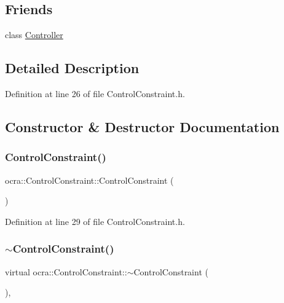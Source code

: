 \subsection*{Friends}
\begin{DoxyCompactItemize}
\item 
class \hyperlink{classocra_1_1ControlConstraint_ac3456fd331a58b288082abca310c7a99}{Controller}
\end{DoxyCompactItemize}


\subsection{Detailed Description}


Definition at line 26 of file Control\+Constraint.\+h.



\subsection{Constructor \& Destructor Documentation}
\hypertarget{classocra_1_1ControlConstraint_a3d911f350d6a51009b670dcf061ab93e}{}\label{classocra_1_1ControlConstraint_a3d911f350d6a51009b670dcf061ab93e} 
\subsubsection{\texorpdfstring{Control\+Constraint()}{ControlConstraint()}}
{\footnotesize\ttfamily ocra\+::\+Control\+Constraint\+::\+Control\+Constraint (\begin{DoxyParamCaption}{ }\end{DoxyParamCaption})\hspace{0.3cm}{\ttfamily [inline]}}



Definition at line 29 of file Control\+Constraint.\+h.

\hypertarget{classocra_1_1ControlConstraint_a49f1eb50f143ef0e438d3af43db9eb31}{}\label{classocra_1_1ControlConstraint_a49f1eb50f143ef0e438d3af43db9eb31} 
\subsubsection{\texorpdfstring{$\sim$\+Control\+Constraint()}{~ControlConstraint()}}
{\footnotesize\ttfamily virtual ocra\+::\+Control\+Constraint\+::$\sim$\+Control\+Constraint (\begin{DoxyParamCaption}{ }\end{DoxyParamCaption})\hspace{0.3cm}{\ttfamily [inline]}, {\ttfamily [virtual]}}



